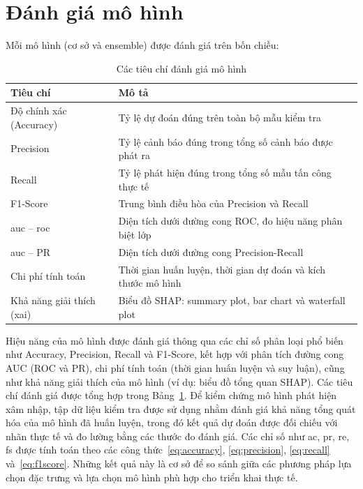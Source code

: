 \clearpage
\section{Đánh giá mô hình}

Mỗi mô hình (cơ sở và ensemble) được đánh giá trên bốn chiều:

\begin{table}[htbp]
\centering
\caption{Các tiêu chí đánh giá mô hình}
\label{tab:evaluation}
\renewcommand{\arraystretch}{1.3}
\begin{tabular}{p{5cm} p{8.5cm}}
\toprule
\textbf{Tiêu chí}                & \textbf{Mô tả} \\
\midrule
Độ chính xác (Accuracy)         & Tỷ lệ dự đoán đúng trên toàn bộ mẫu kiểm tra \\
Precision                        & Tỷ lệ cảnh báo đúng trong tổng số cảnh báo được phát ra \\
Recall                           & Tỷ lệ phát hiện đúng trong tổng số mẫu tấn công thực tế \\
F1-Score                         & Trung bình điều hòa của Precision và Recall \\
\ac{auc} -- \ac{roc}             & Diện tích dưới đường cong ROC, đo hiệu năng phân biệt lớp \\
\ac{auc} -- PR                   & Diện tích dưới đường cong Precision-Recall \\
Chi phí tính toán                & Thời gian huấn luyện, thời gian dự đoán và kích thước mô hình \\
Khả năng giải thích (\ac{xai})  & Biểu đồ SHAP: summary plot, bar chart và waterfall plot \\
\bottomrule
\end{tabular}
\end{table}

Hiệu năng của mô hình được đánh giá thông qua các chỉ số phân loại phổ biến như Accuracy, Precision, Recall và F1-Score, kết hợp với phân tích đường cong AUC (ROC và PR), chi phí tính toán (thời gian huấn luyện và suy luận), cũng như khả năng giải thích của mô hình (ví dụ: biểu đồ tổng quan SHAP). Các tiêu chí đánh giá được tổng hợp trong Bảng~\ref{tab:evaluation}. Để kiểm chứng mô hình phát hiện xâm nhập, tập dữ liệu kiểm tra được sử dụng nhằm đánh giá khả năng tổng quát hóa của mô hình đã huấn luyện, trong đó kết quả dự đoán được đối chiếu với nhãn thực tế và đo lường bằng các thước đo đánh giá. Các chỉ số như \ac{ac}, \ac{pr}, \ac{re}, \ac{fs} được tính toán theo các công thức~\eqref{eq:accuracy}, \eqref{eq:precision}, \eqref{eq:recall} và~\eqref{eq:f1score}. Những kết quả này là cơ sở để so sánh giữa các phương pháp lựa chọn đặc trưng và lựa chọn mô hình phù hợp cho triển khai thực tế.

